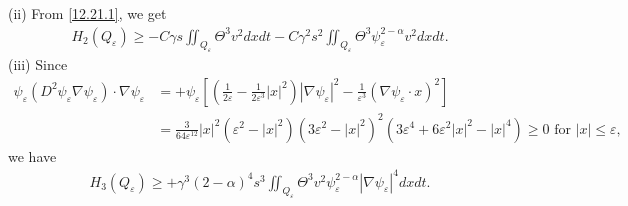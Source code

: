 \documentclass[11pt]{article}
\numberwithin{equation}{section}
\def\e{\varepsilon}
\begin{document}
(ii) From \eqref{12.21.1}, we get
\begin{equation*}
\begin{split}
H_2(Q_\e)\geq -C\gamma s\iint_{Q_\e} \Theta ^3 v^2dxdt-C\gamma^2s^2\iint_{Q_\e}\Theta^3 \psi_\e^{2-\alpha}v^2dxdt.
\end{split}
\end{equation*}
(iii) Since
\begin{equation*}
\begin{split}
\psi_\e (D^2\psi_\e\nabla \psi_\e)\cdot\nabla \psi_\e
&=+\psi_\e\left[\left(\frac{1}{2\varepsilon}-\frac{1}{2\varepsilon^3}|x|^2\right)|\nabla\psi_\e|^2-\frac{1}{\varepsilon^3}(\nabla\psi_\e\cdot x)^2\right]\\
&=\frac{3}{64\varepsilon^{12}}|x|^2(\varepsilon^2-|x|^2)(3\varepsilon^2-|x|^2)^2(3\varepsilon^4+6\varepsilon^2|x|^2-|x|^4)\geq 0 \text{  for } |x|\leq \varepsilon,
\end{split}
\end{equation*}
we have
\begin{equation*}
\begin{split}
H_3(Q_\e) \geq + \gamma^3(2-\alpha)^4s^3\iint_{Q_\e}\Theta^3v^2\psi_\e^{2-\alpha}|\nabla\psi_\e|^4dxdt.
\end{split}
\end{equation*}
\end{document}
